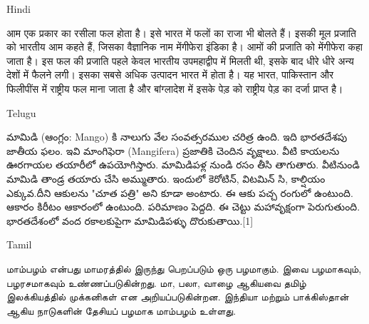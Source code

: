\documentclass{article}
\begin{document}
\newpage

Hindi

आम एक प्रकार का रसीला फल होता है। इसे भारत में फलों का राजा भी बोलते हैं। इसकी मूल प्रजाति को भारतीय आम कहते हैं, जिसका वैज्ञानिक नाम मेंगीफेरा इंडिका है। आमों की प्रजाति को मेंगीफेरा कहा जाता है। इस फल की प्रजाति पहले केवल भारतीय उपमहाद्वीप में मिलती थी, इसके बाद धीरे धीरे अन्य देशों में फैलने लगी। इसका सबसे अधिक उत्पादन भारत में होता है। यह भारत, पाकिस्तान और फिलीपींस में राष्ट्रीय फल माना जाता है और बांग्लादेश में इसके पेड़ को राष्ट्रीय पेड़ का दर्जा प्राप्त है। 



Telugu

మామిడి (ఆంగ్లం: Mango) కి నాలుగు వేల సంవత్సరముల చరిత్ర ఉంది. ఇది భారతదేశపు జాతీయ ఫలం. ఇవి మాంగిఫెరా (Mangifera) ప్రజాతికి చెందిన వృక్షాలు. వీటి కాయలను ఊరగాయల తయారీలో ఉపయోగిస్తారు. మామిడిపళ్ల నుండి రసం తీసి తాగుతారు. వీటినుండి మామిడి తాండ్ర తయారు చేసి అమ్ముతారు. ఇందులో కెరోటిన్, విటమిన్ సి, కాల్షియం ఎక్కువ.దీని ఆకులను "చూత పత్రి" అని కూడా అంటారు. ఈ ఆకు పచ్చ రంగులో ఉంటుంది. ఆకారం కిరీటం ఆకారంలో ఉంటుంది. పరిమాణం పెద్దది. ఈ చెట్టు మహావృక్షంగా పెరుగుతుంది. భారతదేశంలో వంద రకాలకుపైగా మామిడిపళ్ళు దొరుకుతాయి.[1] 


Tamil

மாம்பழம் என்பது மாமரத்தில் இருந்து பெறப்படும் ஒரு பழமாகும். இவை பழமாகவும், பழரசமாகவும் உண்ணப்படுகின்றது. மா, பலா, வாழை ஆகியவை தமிழ் இலக்கியத்தில் முக்கனிகள் என அறியப்படுகின்றன. இந்தியா மற்றும் பாக்கிஸ்தான் ஆகிய நாடுகளின் தேசியப் பழமாக மாம்பழம் உள்ளது. 
\end{document}
